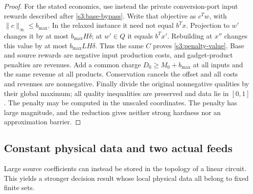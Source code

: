 \begin{proof}
For the stated economics, use instead the private conversion-port input
rewards described after \cref{s3:base-bypass}. Write that objective as
$c^Tw$, with $\|c\|_\infty\le b_{\max}$. In the relaxed instance it
need not equal $b^Tx$. Projection to $w'$ changes it by at most
$b_{\max}H\delta$; at $w'\in Q$ it equals $b^Tx'$. Rebuilding at
$x''$ changes this value by at most $b_{\max}LH\delta$. Thus the
same $C$ proves \eqref{s3:penalty-value}. Base and source rewards are
negative input production costs, and gadget-product penalties are
revenues. Add a common charge $D_0\ge M_0+b_{\max}$ at all inputs
and the same revenue at all products. Conservation cancels the offset
and all costs and revenues are nonnegative. Finally divide the original
nonnegative qualities by their global maximum; all quality inequalities
are preserved and data lie in $[0,1]$. The penalty may be computed in
the unscaled coordinates. The penalty has large magnitude, and the
reduction gives neither strong hardness nor an approximation barrier.
\end{proof}

\subsection{Constant physical data and two actual feeds}\label{s3:constant-data}

Large source coefficients can instead be stored in the topology of a
linear circuit. This yields a stronger decision result whose local
physical data all belong to fixed finite sets.

